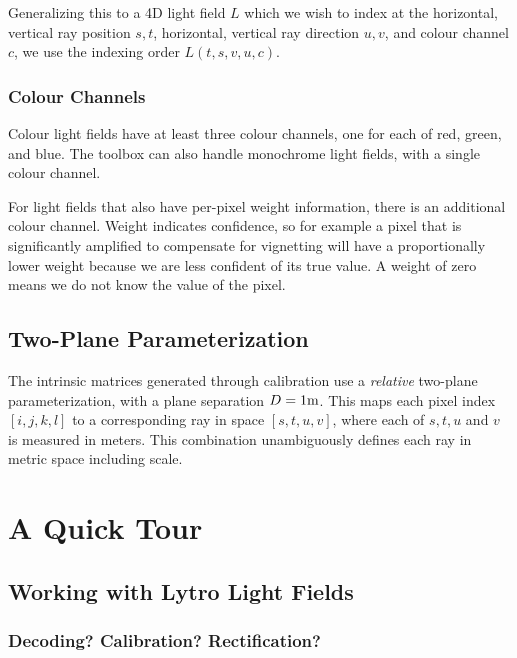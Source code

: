 \documentclass[onecolumn]{article}
\begin{document}
Generalizing this to a 4D light field $L$ which we wish to index at the horizontal, vertical ray position $s,t$, horizontal, vertical ray direction $u,v$, and colour channel $c$, we use the indexing order $L( t,s, v,u, c)$.

\subsubsection{Colour Channels}

Colour light fields have at least three colour channels, one for each of red, green, and blue. The toolbox can also handle monochrome light fields, with a single colour channel. 

For light fields that also have per-pixel weight information, there is an additional colour channel. Weight indicates confidence, so for example a pixel that is significantly amplified to compensate for vignetting will have a proportionally lower weight because we are less confident of its true value. A weight of zero means we do not know the value of the pixel.

\subsection{Two-Plane Parameterization}

The intrinsic matrices generated through calibration use a \emph{relative} two-plane parameterization, with a plane separation $D = 1 \mathrm{m}$. This maps each pixel index $[i,j,k,l]$ to a corresponding ray in space $[s,t,u,v]$, where each of $s,t,u$ and $v$ is measured in meters. This combination unambiguously defines each ray in metric space including scale.


\section{A Quick Tour}
\label{sect_QuickTour}
\subsection{Working with Lytro Light Fields}
\label{sect_DecodingLytro}

\subsubsection{Decoding? Calibration? Rectification?}
\end{document}
